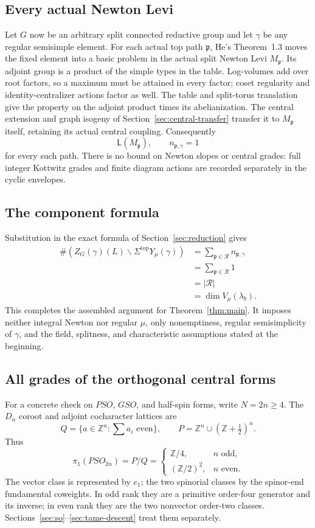 \documentclass[11pt,a4paper]{article}
\theoremstyle{definition}
\theoremstyle{remark}
\begin{document}
\subsection{Every actual Newton Levi}
Let \(G\) now be an arbitrary split connected reductive group and let
\(\gamma\) be any regular semisimple element.
For each actual top path \(\mathfrak p\), He's Theorem~1.3 moves the
fixed element into a basic problem in the actual split Newton Levi
\(M_{\mathfrak p}\).
Its adjoint group is a product of the simple types in the table.
Log-volumes add over root factors, so a maximum must be attained
in every factor; coset regularity and identity-centralizer actions
factor as well.
The table and split-torus translation give the property on the
adjoint product times its abelianization.
The central extension and graph isogeny of
Section~\ref{sec:central-transfer} transfer it to
\(M_{\mathfrak p}\) itself, retaining its actual central coupling.
Consequently
\[
\mathsf L(M_{\mathfrak p}),\qquad n_{\mathfrak p,\gamma}=1
\]
for every such path. There is no bound on Newton slopes or central
grades: full integer Kottwitz grades and finite diagram actions
are recorded separately in the cyclic envelopes.

\subsection{The component formula}
Substitution in the exact formula of Section~\ref{sec:reduction}
gives
\[
\begin{aligned}
\#\left(Z_G(\gamma)(L)\backslash
\Sigma^{\mathrm{top}}Y_\mu(\gamma)\right)
&=\sum_{\mathfrak p\in\mathcal R}n_{\mathfrak p,\gamma}\\
&=\sum_{\mathfrak p\in\mathcal R}1\\
&=|\mathcal R|\\
&=\dim V_\mu(\lambda_b).
\end{aligned}
\]
This completes the assembled argument for Theorem~\ref{thm:main}.
It imposes neither integral Newton nor regular \(\mu\), only
nonemptiness, regular semisimplicity of \(\gamma\), and the field,
splitness, and characteristic assumptions stated at the beginning.

\subsection{All grades of the orthogonal central forms}
For a concrete check on \(PSO\), \(GSO\), and half-spin forms, write
\(N=2n\ge4\). The \(D_n\) coroot and adjoint cocharacter lattices are
\[
Q=\{a\in\mathbb Z^n:\textstyle\sum a_i\text{ even}\},\qquad
P=\mathbb Z^n\cup(\mathbb Z+\tfrac12)^n.
\]
Thus
\[
\pi_1(PSO_{2n})=P/Q=
\begin{cases}
\mathbb Z/4,&n\text{ odd},\\
(\mathbb Z/2)^2,&n\text{ even}.
\end{cases}
\]
The vector class is represented by \(e_1\); the two spinorial
classes by the spinor-end fundamental coweights. In odd rank they
are a primitive order-four generator and its inverse; in even
rank they are the two nonvector order-two classes.
Sections~\ref{sec:so}--\ref{sec:tame-descent} treat them separately.
\end{document}
